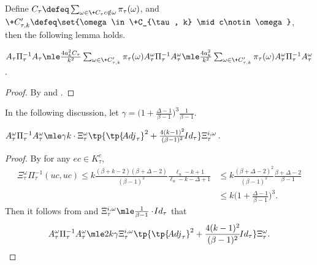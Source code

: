 Define $C_\tau\defeq \sum_{\substack{\omega\in \+C_\tau} \\ c\notin \omega}\pi_\tau(\omega)$,
and $\+C'_{\tau, k}\defeq \set{\omega\in \+C_{\tau, k} \mid c\notin\omega}$,
then the following lemma holds.
\begin{lemma}\label{lem:bound-A-tau-i}
 $A_\tau\Pi_\tau^{-1}A_\tau
 \mle
 \frac{4a_k^2C_\tau}{k^2} \sum_{\omega\in\+C'_{\tau, k}} \pi_\tau(\omega) A_\tau^{\omega}\Pi^{-1}_\tau A_\tau^{\omega}
 \mle
 \frac{4a_k^2}{k^2} \sum_{\omega\in\+C'_{\tau, k}} \pi_\tau(\omega) A_\tau^{\omega}\Pi^{-1}_\tau A_\tau^{\omega}$.
\end{lemma}
\begin{proof}
    By  and .
\end{proof}

In the following discussion,
let $\gamma=\bigg( 1+ \frac{\Delta-1}{\beta-1} \bigg)^3\frac{1}{\beta-1}$.
\begin{lemma}\label{lem:bound-A-tau-i-omega-square}
	$ A_\tau^{\omega} \Pi_\tau^{-1} A_\tau^{\omega}
    \mle \gamma k\cdot \Xi_\tau^{\omega}\tp{\tp{\!{Adj}_\tau}^2
    +
    \frac{4(k-1)^2}{(\beta-1)^2}\!{Id}_\tau}\Xi_\tau^{i,\omega}$.
\end{lemma}
\begin{proof}
	By  for any $ec \in K_\tau^{c}$,
	\begin{align*}
			\Xi_\tau^{\omega}\Pi_\tau^{-1}(uc, uc)\leq
            k \frac{(\beta+k-2)(\beta+\Delta-2)}{(\beta-1)^2}\frac{\ell_u - k + 1}{\ell_u-k-\Delta + 1}
            &\le
            k \frac{(\beta+\Delta-2)^2}{(\beta-1)^2}\frac{\beta + \Delta-2}{\beta-1}
            \\&\le k\bigg( 1+ \frac{\Delta-1}{\beta-1} \bigg)^3.
	\end{align*}
	Then it follows from  and $\Xi_\tau^{i,\omega}\mle \frac{1}{\beta-1}\cdot \!{Id}_{\tau}$ that
	\begin{align*}
	 A_\tau^{\omega} \Pi_\tau^{-1} A_\tau^{\omega}
     \mle
     2 k\gamma \Xi_\tau^{i,\omega}\tp{\tp{\!{Adj}_\tau}^2  + \frac{4(k-1)^2}{(\beta-1)^2}\!{Id}_\tau}\Xi_\tau^{\omega}.
	\end{align*}

\end{proof}

